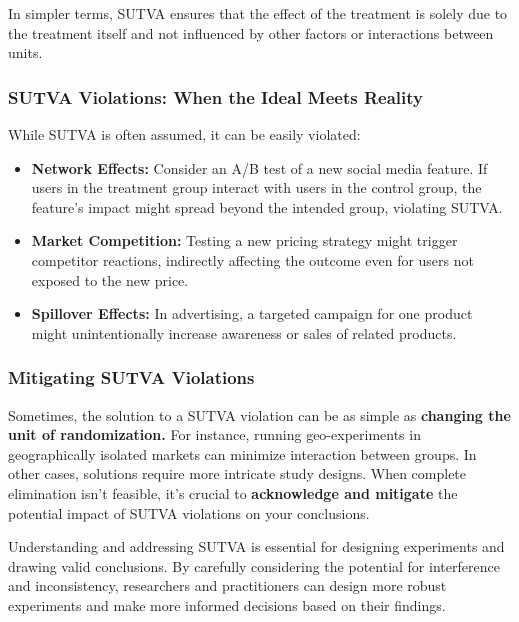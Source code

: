 \documentclass[
  letterpaper,
  DIV=11,
  numbers=noendperiod]{scrreprt}
\begin{document}
In simpler terms, SUTVA ensures that the effect of the treatment is
solely due to the treatment itself and not influenced by other factors
or interactions between units.

\subsubsection{SUTVA Violations: When the Ideal Meets
Reality}\label{sutva-violations-when-the-ideal-meets-reality}

While SUTVA is often assumed, it can be easily violated:

\begin{itemize}
\item
  \textbf{Network Effects:} Consider an A/B test of a new social media
  feature. If users in the treatment group interact with users in the
  control group, the feature's impact might spread beyond the intended
  group, violating SUTVA.
\item
  \textbf{Market Competition:} Testing a new pricing strategy might
  trigger competitor reactions, indirectly affecting the outcome even
  for users not exposed to the new price.
\item
  \textbf{Spillover Effects:} In advertising, a targeted campaign for
  one product might unintentionally increase awareness or sales of
  related products.
\end{itemize}

\subsubsection{Mitigating SUTVA
Violations}\label{mitigating-sutva-violations}

Sometimes, the solution to a SUTVA violation can be as simple as
\textbf{changing the unit of randomization.} For instance, running
geo-experiments in geographically isolated markets can minimize
interaction between groups. In other cases, solutions require more
intricate study designs. When complete elimination isn't feasible, it's
crucial to \textbf{acknowledge and mitigate} the potential impact of
SUTVA violations on your conclusions.

\begin{tcolorbox}[enhanced jigsaw, colframe=quarto-callout-note-color-frame, left=2mm, toprule=.15mm, colbacktitle=quarto-callout-note-color!10!white, title=\textcolor{quarto-callout-note-color}{\faInfo}\hspace{0.5em}{Key Takeaway:}, coltitle=black, rightrule=.15mm, leftrule=.75mm, colback=white, arc=.35mm, bottomtitle=1mm, bottomrule=.15mm, breakable, titlerule=0mm, opacitybacktitle=0.6, toptitle=1mm, opacityback=0]

Understanding and addressing SUTVA is essential for designing
experiments and drawing valid conclusions. By carefully considering the
potential for interference and inconsistency, researchers and
practitioners can design more robust experiments and make more informed
decisions based on their findings.

\end{tcolorbox}
\end{document}
